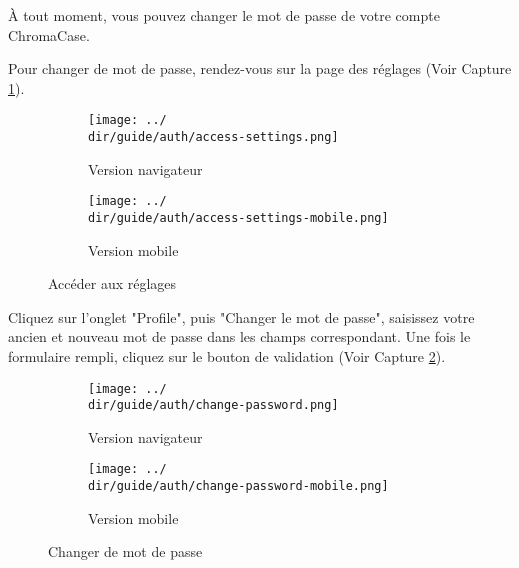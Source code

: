 À tout moment, vous pouvez changer le mot de passe de votre compte ChromaCase.

Pour changer de mot de passe, rendez-vous sur la page des réglages (Voir Capture \ref{fig:access-settings-password}).

\begin{figure}[H]
	\begin{subfigure}[b]{0.7\textwidth}
		\texttt{[image: ../\\dir/guide/auth/access-settings.png]}
		\caption{Version navigateur}
	\end{subfigure}
	\begin{subfigure}[b]{0.25\textwidth}
		\texttt{[image: ../\\dir/guide/auth/access-settings-mobile.png]}
		\caption{Version mobile}
	\end{subfigure}
	\caption{Accéder aux réglages}
	\label{fig:access-settings-password}
\end{figure}

Cliquez sur l'onglet "Profile", puis "Changer le mot de passe", saisissez votre ancien et nouveau mot de passe dans les champs correspondant. Une fois le formulaire rempli, cliquez sur le bouton de validation (Voir Capture \ref{fig:change-password}).

\begin{figure}[H]
	\begin{subfigure}[b]{0.7\textwidth}
		\texttt{[image: ../\\dir/guide/auth/change-password.png]}
		\caption{Version navigateur}
	\end{subfigure}
	\begin{subfigure}[b]{0.25\textwidth}
		\texttt{[image: ../\\dir/guide/auth/change-password-mobile.png]}
		\caption{Version mobile}
	\end{subfigure}
	\caption{Changer de mot de passe}
	\label{fig:change-password}
\end{figure}